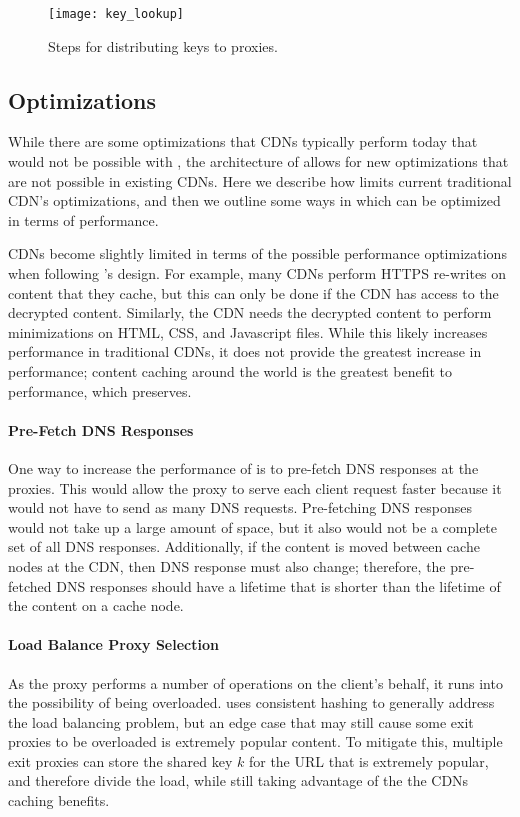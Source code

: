 \begin{figure}[t]
\centering
\texttt{[image: key\_lookup]}
\caption{Steps for distributing keys to proxies.}
\label{fig:keys}
\end{figure}

\subsection{Optimizations}
\label{sec:optimizations}
While there are some optimizations that CDNs typically perform today that would not be possible with \system{}, the architecture 
of \system{} allows for new optimizations that are not possible in existing CDNs.  Here we describe how \system{} limits 
current traditional CDN's optimizations, and then we outline some ways in which \system{} 
can be optimized in terms of performance.

CDNs become slightly limited in terms of the possible performance optimizations when following \system{}'s design.  For example, 
many CDNs perform HTTPS re-writes on content that they cache, but this can only be done if the CDN has access to the 
decrypted content.  Similarly, the CDN needs the decrypted content to perform minimizations on HTML, CSS, and Javascript 
files.  While this likely increases performance in traditional CDNs, it does not provide the greatest increase in performance; 
content caching around the world is the greatest benefit to performance, which \system{} preserves.

\paragraph{Pre-Fetch DNS Responses} One way to increase the performance of \system{} is to pre-fetch DNS responses at 
the proxies.  This would allow the proxy to serve each client request faster because it would not have to send 
as many DNS requests.  Pre-fetching DNS responses would not take up a large amount of space, but it also 
would not be a complete set of all DNS responses.  Additionally, if the content is moved between cache nodes 
at the CDN, then DNS response must also change; therefore, the pre-fetched DNS responses should have a 
lifetime that is shorter than the lifetime of the content on a cache node.

\paragraph{Load Balance Proxy Selection} As the proxy performs a number of operations on the client's behalf, it 
runs into the possibility of being overloaded.  \system{} uses consistent hashing to generally address the load balancing 
problem, but an edge case that may still cause some exit proxies to be overloaded is extremely popular content.  To mitigate this, 
multiple exit proxies can store the shared key $k$ for the URL that is extremely popular, and therefore divide the load, while 
still taking advantage of the the CDNs caching benefits.  

